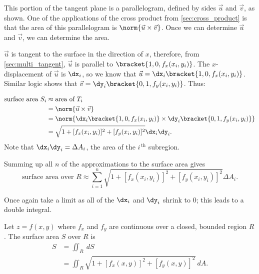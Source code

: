 This portion of the tangent plane is a parallelogram, defined by sides $\vec u$ and $\vec v$, as shown. One of the applications of the cross product from \autoref{sec:cross_product} is that the area of this parallelogram is $\norm{\vec u\times \vec v}$. Once we can determine $\vec u$ and $\vec v$, we can determine the area.

$\vec u$ is tangent to the surface in the direction of $x$, therefore, from \autoref{sec:multi_tangent}, $\vec u$ is parallel to $\bracket{1,0,f_x(x_i,y_i)}$. The $x$-displacement of $\vec u$ is $\dx_i$, so we know that $\vec u = \dx_i\bracket{1,0,f_x(x_i,y_i)}$. Similar logic shows that $\vec v = \dy_i\bracket{0,1,f_y(x_i,y_i)}$. Thus:

\begin{align*}
\text{surface area $S_i$}
	&\approx \text{area of  $T_i$}\\
	&= \norm{\vec u\times \vec v}\\
	&= \norm{\dx_i\bracket{1,0,f_x(x_i,y_i)}\times\dy_i\bracket{0,1,f_y(x_i,y_i)}}\\
	&=\sqrt{1+[f_x(x_i,y_i)]^2+[f_y(x_i,y_i)]^2}\dx_i\dy_i.
\end{align*}
Note that $\dx_i\dy_i = \Delta A_i$, the area of the $i^{\,\text{th}}$ subregion.

Summing up all $n$ of the approximations to the surface area gives
\[\text{surface area over $R$} \approx \sum_{i=1}^n \sqrt{1+[f_x(x_i,y_i)]^2+[f_y(x_i,y_i)]^2}\Delta A_i.\]

Once again take a limit as all of the $\dx_i$ and $\dy_i$ shrink to 0; this leads to a double integral.


{Let $z=f(x,y)$ where $f_x$ and $f_y$ are continuous over a closed, bounded region $R$. The surface area $S$ over $R$ is 
\begin{align*}
S &= \iint_R \ dS\\
&=\iint_R \sqrt{1+[f_x(x,y)]^2+[f_y(x,y)]^2}\ dA.
\end{align*}}

